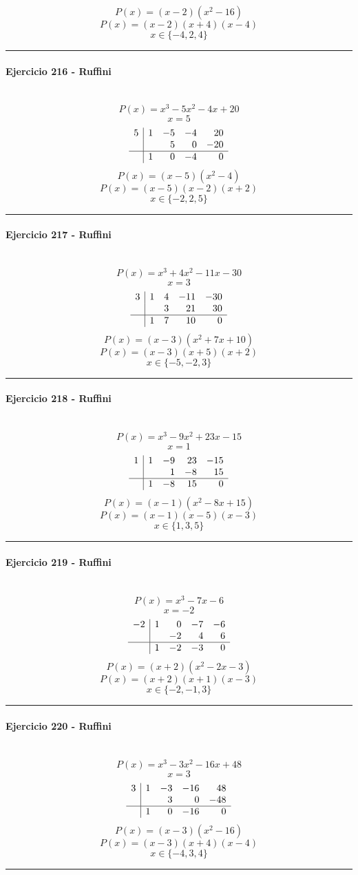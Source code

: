 \documentclass[10pt,a4paper]{article}
\newcommand{\res}[1]{\paragraph{#1}\mbox{}\\[-1.2em]}
\begin{document}
\[ P(x)=(x-2)(x^{2} - 16) \]
\[ P(x)=(x-2)(x+4)(x-4) \]
\[ \boxed{x\in\{-4,2,4\}} \]
\vspace{1mm}\hrule\vspace{2mm}
\res{Ejercicio 216 - Ruffini}
\[ P(x)=x^{3} - 5 x^{2} - 4 x + 20 \]
\[ x=5 \]
\[\begin{array}{r|rrrr}5 & 1 & -5 & -4 & 20\\  &  & 5 & 0 & -20\\\hline  & 1 & 0 & -4 & 0\end{array}\]
\[ P(x)=(x-5)(x^{2} - 4) \]
\[ P(x)=(x-5)(x-2)(x+2) \]
\[ \boxed{x\in\{-2,2,5\}} \]
\vspace{1mm}\hrule\vspace{2mm}
\res{Ejercicio 217 - Ruffini}
\[ P(x)=x^{3} + 4 x^{2} - 11 x - 30 \]
\[ x=3 \]
\[\begin{array}{r|rrrr}3 & 1 & 4 & -11 & -30\\  &  & 3 & 21 & 30\\\hline  & 1 & 7 & 10 & 0\end{array}\]
\[ P(x)=(x-3)(x^{2} + 7 x + 10) \]
\[ P(x)=(x-3)(x+5)(x+2) \]
\[ \boxed{x\in\{-5,-2,3\}} \]
\vspace{1mm}\hrule\vspace{2mm}
\res{Ejercicio 218 - Ruffini}
\[ P(x)=x^{3} - 9 x^{2} + 23 x - 15 \]
\[ x=1 \]
\[\begin{array}{r|rrrr}1 & 1 & -9 & 23 & -15\\  &  & 1 & -8 & 15\\\hline  & 1 & -8 & 15 & 0\end{array}\]
\[ P(x)=(x-1)(x^{2} - 8 x + 15) \]
\[ P(x)=(x-1)(x-5)(x-3) \]
\[ \boxed{x\in\{1,3,5\}} \]
\vspace{1mm}\hrule\vspace{2mm}
\res{Ejercicio 219 - Ruffini}
\[ P(x)=x^{3} - 7 x - 6 \]
\[ x=-2 \]
\[\begin{array}{r|rrrr}-2 & 1 & 0 & -7 & -6\\  &  & -2 & 4 & 6\\\hline  & 1 & -2 & -3 & 0\end{array}\]
\[ P(x)=(x+2)(x^{2} - 2 x - 3) \]
\[ P(x)=(x+2)(x+1)(x-3) \]
\[ \boxed{x\in\{-2,-1,3\}} \]
\vspace{1mm}\hrule\vspace{2mm}
\res{Ejercicio 220 - Ruffini}
\[ P(x)=x^{3} - 3 x^{2} - 16 x + 48 \]
\[ x=3 \]
\[\begin{array}{r|rrrr}3 & 1 & -3 & -16 & 48\\  &  & 3 & 0 & -48\\\hline  & 1 & 0 & -16 & 0\end{array}\]
\[ P(x)=(x-3)(x^{2} - 16) \]
\[ P(x)=(x-3)(x+4)(x-4) \]
\[ \boxed{x\in\{-4,3,4\}} \]
\vspace{1mm}\hrule\vspace{2mm}
\end{document}
